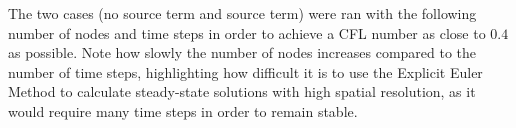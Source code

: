 \documentclass[10pt, letter, showtrims]{extarticle}
\begin{document}
		\noindent
		The two cases (no source term and source term) were ran with the following number of nodes and time steps in order to achieve a CFL number as close to $0.4$ as possible. Note how slowly the number of nodes increases compared to the number of time steps, highlighting how difficult it is to use the Explicit Euler Method to calculate steady-state solutions with high spatial resolution, as it would require many time steps in order to remain stable.		
		
		\FloatBarrier
		\begin{table}[h]
			\caption{Constant CFL Number of 0.4}
			\centering
			\label{tbl:stability}
		\end{table}
		\FloatBarrier
		
		\pagebreak
		
\end{document}
